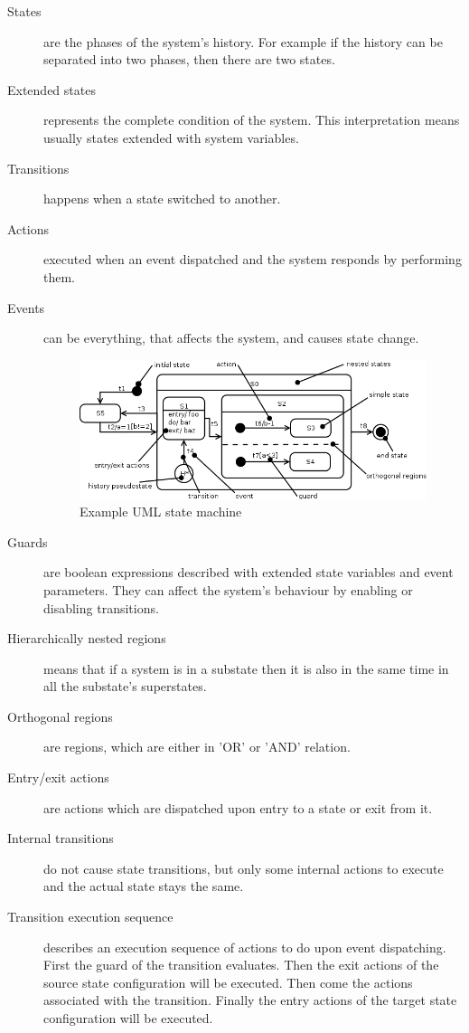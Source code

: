 \begin{description}
	\item[States] are the phases of the system's history. For example if the history can be separated into two phases, then there are two states. 
	\item[Extended states] represents the complete condition of the system. This interpretation means usually states extended with system variables.
	\item[Transitions] happens when a state switched to another.
	\item[Actions] executed when an event dispatched and the system responds by performing them.
	\item[Events] can be everything, that affects the system, and causes state change.
	
\begin{figure}[htp]
\centering
\includegraphics[scale=0.5]{figures/mbt_smexample}
\caption{Example UML state machine}
\label{fig:mbt_smexample}
\end{figure}
	
	\item[Guards] are boolean expressions described with extended state variables and event parameters. They can affect the system's behaviour by enabling or disabling transitions.
	\item[Hierarchically nested regions] means that if a system is in a substate then it is also in the same time in all the substate's superstates.
	\item[Orthogonal regions] are regions, which are either in 'OR'  or 'AND' relation.
	\item[Entry/exit actions] are actions which are dispatched upon entry to a state or exit from it.
	\item[Internal transitions] do not cause state transitions, but only some internal actions to execute and the actual state stays the same.
	\item[Transition execution sequence] describes an execution sequence of actions to do upon event dispatching. First the guard of the transition evaluates. Then the exit actions of the source state configuration will be executed. Then come the actions associated with the transition. Finally the entry actions of the target state configuration will be executed.
\end{description}

